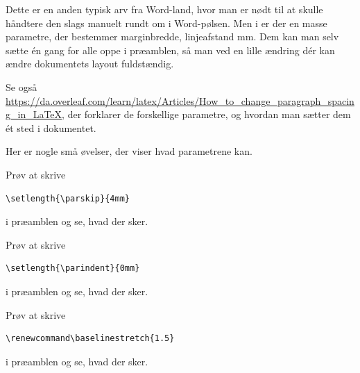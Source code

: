 Dette er en anden typisk arv fra Word-land, hvor man er nødt til at
skulle håndtere den slags manuelt rundt om i Word-pølsen. Men i \latex
er der en masse parametre, der bestemmer marginbredde, linjeafstand
mm. Dem kan man selv sætte én gang for alle oppe i præamblen, så man
ved en lille ændring dér kan ændre dokumentets layout fuldstændig.

Se også
\url{https://da.overleaf.com/learn/latex/Articles/How_to_change_paragraph_spacing_in_LaTeX},
der forklarer de forskellige parametre, og hvordan man sætter dem ét
sted i dokumentet.

Her er nogle små øvelser, der viser hvad parametrene kan.


\begin{ovelse}
  Prøv at skrive
\begin{verbatim}
\setlength{\parskip}{4mm}
\end{verbatim}
  i præamblen og se, hvad der sker.
\end{ovelse}

\begin{ovelse}
  Prøv at skrive
\begin{verbatim}
\setlength{\parindent}{0mm}
\end{verbatim}
  i præamblen og se, hvad der sker.
\end{ovelse}

\begin{ovelse}
  Prøv at skrive
  \begin{verbatim}
\renewcommand\baselinestretch{1.5}
\end{verbatim}
  i præamblen og se, hvad der sker.
\end{ovelse}


